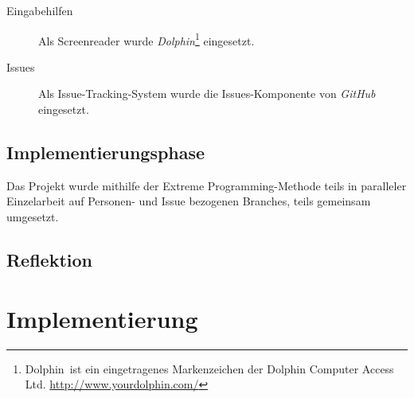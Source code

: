 \documentclass[	a4paper,		%
		titlepage, 		%
		fontsize=12pt		%
		]{scrartcl} 		%
\begin{document}
\begin{description}
 \item[Eingabehilfen]
 Als Screenreader wurde \emph{Dolphin}\footnote{Dolphin\textregistered ~ist ein eingetragenes Markenzeichen der Dolphin Computer Access Ltd. \newline \href{http://www.yourdolphin.com/}{http://www.yourdolphin.com/}} eingesetzt.

  \item[Issues]
Als Issue-Tracking-System wurde die Issues-Komponente von \emph{GitHub} eingesetzt.

 \end{description}

\subsection{Implementierungsphase}
Das Projekt wurde mithilfe der Extreme Programming-Methode teils in paralleler Einzelarbeit auf Personen- und Issue bezogenen Branches, teils gemeinsam umgesetzt.

\subsection{Reflektion}

\section{Implementierung}
\end{document}

